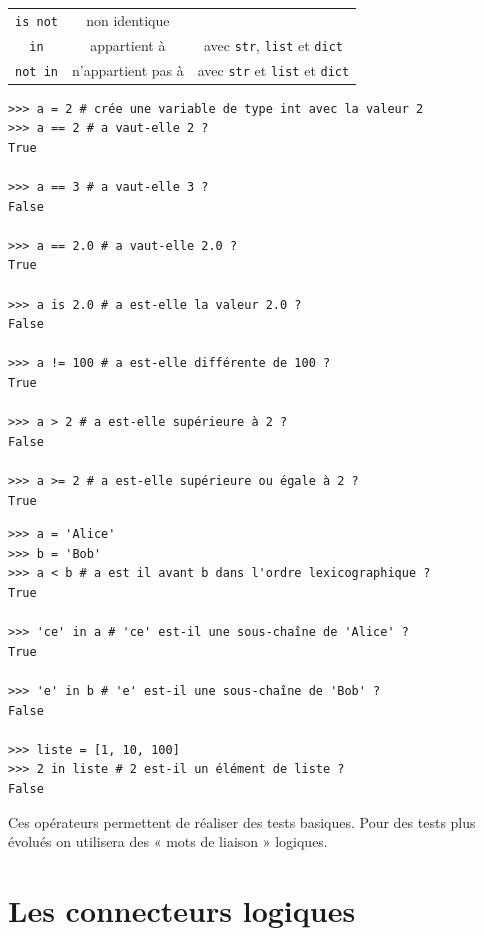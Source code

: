 {\begin{tabular}{C|C|C}
	\texttt{is not} & non identique         &                                                                                                                         \\
	
	\texttt{in}     & appartient à          & avec \texttt{str}, \texttt{list} et \texttt{dict}                                   \\
	
	\texttt{not in} & n'appartient pas à    & avec \texttt{str} et \texttt{list} et \texttt{dict}                                 \\
\end{tabular}
}\normalsize

\begin{pyc}
	\begin{verbatim}
>>> a = 2 # crée une variable de type int avec la valeur 2
>>> a == 2 # a vaut-elle 2 ?
True

>>> a == 3 # a vaut-elle 3 ?
False

>>> a == 2.0 # a vaut-elle 2.0 ?
True

>>> a is 2.0 # a est-elle la valeur 2.0 ?
False

>>> a != 100 # a est-elle différente de 100 ?
True

>>> a > 2 # a est-elle supérieure à 2 ?
False

>>> a >= 2 # a est-elle supérieure ou égale à 2 ?
True
    \end{verbatim}
\end{pyc}

\begin{pyc}
	\begin{verbatim}
>>> a = 'Alice'
>>> b = 'Bob'
>>> a < b # a est il avant b dans l'ordre lexicographique ?
True

>>> 'ce' in a # 'ce' est-il une sous-chaîne de 'Alice' ?
True

>>> 'e' in b # 'e' est-il une sous-chaîne de 'Bob' ?
False

>>> liste = [1, 10, 100]
>>> 2 in liste # 2 est-il un élément de liste ?
False
    \end{verbatim}
\end{pyc}

Ces opérateurs permettent de réaliser des tests basiques. Pour des tests plus évolués on utilisera des « mots de liaison »  logiques.

\section{Les connecteurs logiques}

